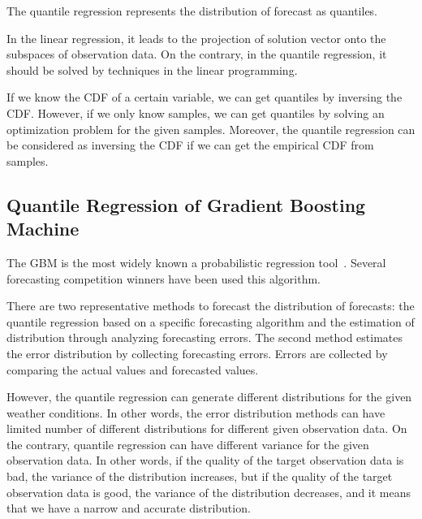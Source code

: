 \documentclass[journal]{IEEEtran} %
\begin{document}
The quantile regression represents the distribution of forecast as quantiles.




In the linear regression, it leads to the projection of solution vector onto the subspaces of observation data. On the contrary, in the quantile regression, it should be solved by techniques in the linear programming.





If we know the CDF of a certain variable, we can get quantiles by inversing the CDF. However, if we only know samples, we can get quantiles by solving an optimization problem for the given samples. Moreover, the quantile regression can be considered as inversing the CDF if we can get the empirical CDF from samples.






\subsection{Quantile Regression of Gradient Boosting Machine}
The GBM is the most widely known a probabilistic regression tool~\cite{Friedman}. Several forecasting competition winners have been used this algorithm. 


There are two representative methods to forecast the distribution of forecasts: the quantile regression based on a specific forecasting algorithm and the estimation of distribution through analyzing forecasting errors. 
%
The second method estimates the error distribution by collecting forecasting errors. Errors are collected by comparing the actual values and forecasted values. 

However, the quantile regression can generate different distributions for the given weather conditions. In other words, the error distribution methods can have limited number of different distributions for different given observation data. On the contrary, quantile regression can have different variance for the given observation data. In other words, if the quality of the target observation data is bad, the variance of the distribution increases, but if the quality of the target observation data is good, the variance of the distribution decreases, and it means that we have a narrow and accurate distribution.
\end{document}
